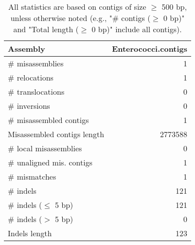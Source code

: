 \documentclass[12pt,a4paper]{article}
\begin{document}
\begin{table}[ht]
\begin{center}
\caption{All statistics are based on contigs of size $\geq$ 500 bp, unless otherwise noted (e.g., "\# contigs ($\geq$ 0 bp)" and "Total length ($\geq$ 0 bp)" include all contigs).}
\begin{tabular}{|l*{1}{|r}|}
\hline
Assembly & Enterococci.contigs \\ \hline
\# misassemblies & 1 \\ \hline
\hspace{5mm}\# relocations & 1 \\ \hline
\hspace{5mm}\# translocations & 0 \\ \hline
\hspace{5mm}\# inversions & 0 \\ \hline
\# misassembled contigs & 1 \\ \hline
Misassembled contigs length & 2773588 \\ \hline
\# local misassemblies & 0 \\ \hline
\# unaligned mis. contigs & 1 \\ \hline
\# mismatches & 1 \\ \hline
\# indels & 121 \\ \hline
\hspace{5mm}\# indels ($\leq$ 5 bp) & 121 \\ \hline
\hspace{5mm}\# indels ($>$ 5 bp) & 0 \\ \hline
Indels length & 123 \\ \hline
\end{tabular}
\end{center}
\end{table}
\end{document}
